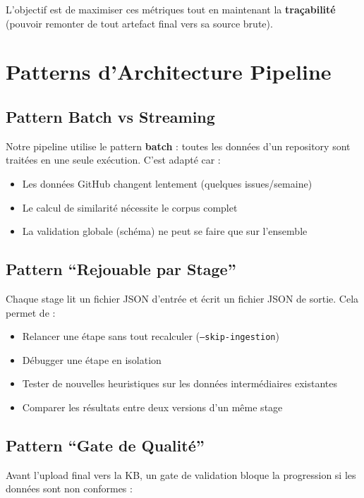 \documentclass[12pt,a4paper]{report}
\begin{document}
L'objectif est de maximiser ces métriques tout en maintenant la \textbf{traçabilité} (pouvoir remonter de tout artefact final vers sa source brute).

\section{Patterns d'Architecture Pipeline}

\subsection{Pattern Batch vs Streaming}

Notre pipeline utilise le pattern \textbf{batch} : toutes les données d'un repository sont traitées en une seule exécution. C'est adapté car :
\begin{itemize}
  \item Les données GitHub changent lentement (quelques issues/semaine)
  \item Le calcul de similarité nécessite le corpus complet
  \item La validation globale (schéma) ne peut se faire que sur l'ensemble
\end{itemize}

\subsection{Pattern ``Rejouable par Stage''}

Chaque stage lit un fichier JSON d'entrée et écrit un fichier JSON de sortie. Cela permet de :
\begin{itemize}
  \item Relancer une étape sans tout recalculer (\texttt{--skip-ingestion})
  \item Débugger une étape en isolation
  \item Tester de nouvelles heuristiques sur les données intermédiaires existantes
  \item Comparer les résultats entre deux versions d'un même stage
\end{itemize}

\subsection{Pattern ``Gate de Qualité''}

Avant l'upload final vers la KB, un gate de validation bloque la progression si les données sont non conformes :
\end{document}
